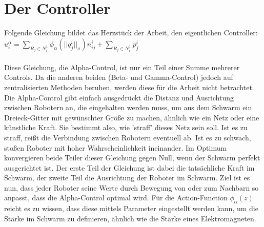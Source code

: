 \section{Der Controller}

Folgende Gleichung bildet das Herzstück der Arbeit, den eigentlichen Controller:\\

$u_i^\alpha=\sum\limits_{R_j\in N_i^1}\phi_\alpha(||q_j^i||_\sigma)n_{ij}^i+
\sum\limits_{R_j\in N_i^1}p_j^i$\\\\
Diese Gleichung, die Alpha-Control, ist nur ein Teil einer Summe mehrerer Controls. Da die anderen beiden
(Beta- und Gamma-Control) jedoch auf zentralisierten Methoden beruhen, werden diese für die Arbeit nicht
betrachtet. Die Alpha-Control gibt einfach ausgedrückt die Distanz und Ausrichtung zwischen Robotern an,
die eingehalten werden muss, um aus dem Schwarm ein Dreieck-Gitter mit gewünschter Größe zu machen, 
ähnlich wie ein Netz oder eine künstliche Kraft. Sie bestimmt also, wie 'straff' dieses Netz sein soll. 
Ist es zu straff, reißt die Verbindung zwischen Robotern eventuell ab. Ist es zu schwach, stoßen Roboter 
mit hoher Wahrscheinlichkeit ineinander. Im Optimum konvergieren beide Teiler dieser Gleichung gegen 
Null, wenn der Schwarm perfekt ausgerichtet ist. Der erste Teil der Gleichung ist dabei die tatsächliche
Kraft im Schwarm, der zweite Teil die Ausrichtung der Roboter im Schwarm. Ziel ist es nun, dass jeder
Roboter seine Werte durch Bewegung von oder zum Nachbarn so anpasst, dass die Alpha-Control optimal wird.
Für die Action-Function $\phi_\alpha(z)$ reicht es zu wissen, dass diese mittels Parameter eingestellt
werden kann, um die Stärke im Schwarm zu definieren, ähnlich wie die Stärke eines Elektromagneten.
